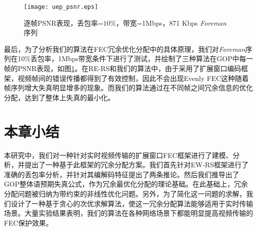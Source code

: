 \begin{figure}[htbp]
  \centering
  \texttt{[image: uep\_psnr.eps]}
  \caption{逐帧PSNR表现，丢包率=$10\%$，带宽=1Mbps，871 Kbps \emph{Foreman}序列}\label{fig:psnr}
\end{figure}

最后，为了分析我们的算法在FEC冗余优化分配中的具体原理，我们对\emph{Foreman}序列在10\%丢包率，1Mbps带宽条件下进行了测试，并绘制了三种算法在GOP中每一帧的PSNR表现，如图\ref{fig:psnr}。在RE-RS和我们的算法中，由于采用了扩展窗口编码框架，视频帧间的错误传播都得到了有效控制，因此不会出现Evenly FEC这种随着帧序列增大失真明显增多的现象。而我们的算法通过在不同帧之间冗余信息的优化分配，达到了整体上失真的最小化。


\section{本章小结}
本研究中，我们对一种针对实时视频传输的扩展窗口FEC框架进行了建模、分析，并提出了一种基于此框架的冗余分配方案。我们首先针对EW-RS框架进行了准确的丢包率分析，并针对其编解码特征提出了两条推论。然后我们推导出了GOP整体语预期失真公式，作为冗余最优化分配的理论基础。在此基础上，冗余分配问题被归纳为带约束的非线性优化问题。另外，为了简化这一问题的求解，我们设计了一种基于贪心的次优求解算法，使这一冗余分配算法能够适用于实时传输场景。大量实验结果表明，我们的算法在各种网络场景下都能明显提高视频传输的FEC保护效果。
